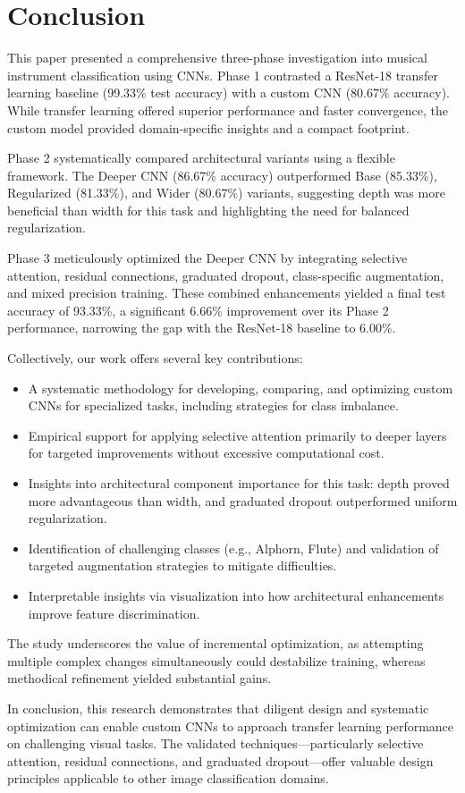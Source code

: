 \section{Conclusion}
This paper presented a comprehensive three-phase investigation into musical instrument classification using CNNs. Phase 1 contrasted a ResNet-18 transfer learning baseline (99.33\% test accuracy) with a custom CNN (80.67\% accuracy). While transfer learning offered superior performance and faster convergence, the custom model provided domain-specific insights and a compact footprint.

Phase 2 systematically compared architectural variants using a flexible framework. The Deeper CNN (86.67\% accuracy) outperformed Base (85.33\%), Regularized (81.33\%), and Wider (80.67\%) variants, suggesting depth was more beneficial than width for this task and highlighting the need for balanced regularization.

Phase 3 meticulously optimized the Deeper CNN by integrating selective attention, residual connections, graduated dropout, class-specific augmentation, and mixed precision training. These combined enhancements yielded a final test accuracy of 93.33\%, a significant 6.66\% improvement over its Phase 2 performance, narrowing the gap with the ResNet-18 baseline to 6.00\%.

Collectively, our work offers several key contributions:
\begin{itemize}
    \item A systematic methodology for developing, comparing, and optimizing custom CNNs for specialized tasks, including strategies for class imbalance.
    \item Empirical support for applying selective attention primarily to deeper layers for targeted improvements without excessive computational cost.
    \item Insights into architectural component importance for this task: depth proved more advantageous than width, and graduated dropout outperformed uniform regularization.
    \item Identification of challenging classes (e.g., Alphorn, Flute) and validation of targeted augmentation strategies to mitigate difficulties.
    \item Interpretable insights via visualization into how architectural enhancements improve feature discrimination.
\end{itemize}

The study underscores the value of incremental optimization, as attempting multiple complex changes simultaneously could destabilize training, whereas methodical refinement yielded substantial gains.

In conclusion, this research demonstrates that diligent design and systematic optimization can enable custom CNNs to approach transfer learning performance on challenging visual tasks. The validated techniques—particularly selective attention, residual connections, and graduated dropout—offer valuable design principles applicable to other image classification domains.
